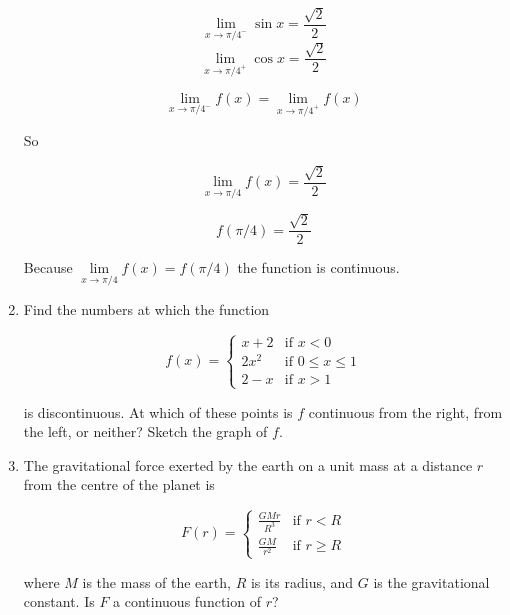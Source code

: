 \documentclass{article}
\begin{document}
\begin{enumerate}
				$$\lim \limits _{x \to \pi/4^{-}} \sin x = \frac{\sqrt{2}}{2}$$
				$$\lim \limits _{x \to \pi/4^{+}} \cos x = \frac{\sqrt{2}}{2}$$


				$$\lim \limits _{x\to \pi/4^{-}} f(x) = \lim \limits _{x \to \pi/4^{+}} f(x)$$

				So

				$$\lim \limits _{x \to \pi/4} f(x) = \frac{\sqrt{2}}{2}$$

				$$f(\pi/4) = \frac{\sqrt{2}}{2}$$

				Because $\lim \limits _{x \to \pi/4} f(x) = f(\pi/4)$ the function is continuous.

			\item Find the numbers at which the function 

				$$f(x) =
					\begin{cases}
						x + 2 & \text{if } x < 0 \\
						2x^2 & \text{if } 0 \leq x \leq 1 \\
						2 - x & \text{if } x > 1
					\end{cases}$$

			is discontinuous. At which of these points is $f$ continuous from the right, from the left,
			or neither? Sketch the graph of $f$.


			\item The gravitational force exerted by the earth on a unit mass at a distance $r$ from the
			centre of the planet is

				$$F(r) = 
					\begin{cases}
						\frac{GMr}{R^3} & \text{if } r < R \\
						\frac{GM}{r^2} & \text{if } r \geq R
					\end{cases}$$	

			where $M$ is the mass of the earth, $R$ is its radius, and $G$ is the gravitational constant.
			Is $F$ a continuous function of $r$?
	\end{enumerate}
\end{document}
